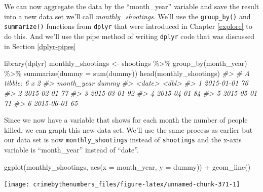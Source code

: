 \documentclass[
]{krantz}
\makeatletter
\newenvironment{Shaded}{\begin{snugshade}}{\end{snugshade}}
\newcommand{\AttributeTok}[1]{\textcolor[rgb]{0.61,0.61,0.61}{#1}}
\newcommand{\CommentTok}[1]{\textcolor[rgb]{0.37,0.37,0.37}{\textit{#1}}}
\newcommand{\FunctionTok}[1]{\textcolor[rgb]{0,0,0}{#1}}
\newcommand{\NormalTok}[1]{#1}
\newcommand{\OtherTok}[1]{\textcolor[rgb]{0.37,0.37,0.37}{#1}}
\newcommand{\SpecialCharTok}[1]{\textcolor[rgb]{0,0,0}{#1}}
\newenvironment{kframe}{%
\medskip{}
\setlength{\fboxsep}{.8em}
 \def\at@end@of@kframe{}%
 \ifinner\ifhmode%
  \def\at@end@of@kframe{\end{minipage}}%
  \begin{minipage}{\columnwidth}%
 \fi\fi%
 \def\FrameCommand##1{\hskip\@totalleftmargin \hskip-\fboxsep
 \colorbox{shadecolor}{##1}\hskip-\fboxsep
     \hskip-\linewidth \hskip-\@totalleftmargin \hskip\columnwidth}%
 \MakeFramed {\advance\hsize-\width
   \@totalleftmargin\z@ \linewidth\hsize
   \@setminipage}}%
 {\par\unskip\endMakeFramed%
 \at@end@of@kframe}
\renewenvironment{Shaded}{\begin{kframe}}{\end{kframe}}
\makeatother
\begin{document}
We can now aggregate the data by the ``month\_year'' variable and save the result into a new data set we'll call \emph{monthly\_shootings}. We'll use the \texttt{group\_by()} and \texttt{summarize()} functions from \texttt{dplyr} that were introduced in Chapter \ref{explore} to do this. And we'll use the pipe method of writing \texttt{dplyr} code that was discussed in Section \ref{dplyr-pipes}

\begin{Shaded}
\begin{Highlighting}[]
\FunctionTok{library}\NormalTok{(dplyr)}
\NormalTok{monthly\_shootings }\OtherTok{\textless{}{-}}\NormalTok{ shootings }\SpecialCharTok{\%\textgreater{}\%}
  \FunctionTok{group\_by}\NormalTok{(month\_year) }\SpecialCharTok{\%\textgreater{}\%} 
  \FunctionTok{summarize}\NormalTok{(}\AttributeTok{dummy =} \FunctionTok{sum}\NormalTok{(dummy))}
\FunctionTok{head}\NormalTok{(monthly\_shootings)}
\CommentTok{\#\textgreater{} \# A tibble: 6 x 2}
\CommentTok{\#\textgreater{}   month\_year dummy}
\CommentTok{\#\textgreater{}   \textless{}date\textgreater{}     \textless{}dbl\textgreater{}}
\CommentTok{\#\textgreater{} 1 2015{-}01{-}01    76}
\CommentTok{\#\textgreater{} 2 2015{-}02{-}01    77}
\CommentTok{\#\textgreater{} 3 2015{-}03{-}01    92}
\CommentTok{\#\textgreater{} 4 2015{-}04{-}01    84}
\CommentTok{\#\textgreater{} 5 2015{-}05{-}01    71}
\CommentTok{\#\textgreater{} 6 2015{-}06{-}01    65}
\end{Highlighting}
\end{Shaded}

Since we now have a variable that shows for each month the number of people killed, we can graph this new data set. We'll use the same process as earlier but our data set is now \texttt{monthly\_shootings} instead of \texttt{shootings} and the x-axis variable is ``month\_year'' instead of ``date''.

\begin{Shaded}
\begin{Highlighting}[]
\FunctionTok{ggplot}\NormalTok{(monthly\_shootings, }\FunctionTok{aes}\NormalTok{(}\AttributeTok{x =}\NormalTok{ month\_year, }\AttributeTok{y =}\NormalTok{ dummy)) }\SpecialCharTok{+}
  \FunctionTok{geom\_line}\NormalTok{()}
\end{Highlighting}
\end{Shaded}

\begin{center}\texttt{[image: crimebythenumbers\_files/figure-latex/unnamed-chunk-371-1]} \end{center}
\end{document}
